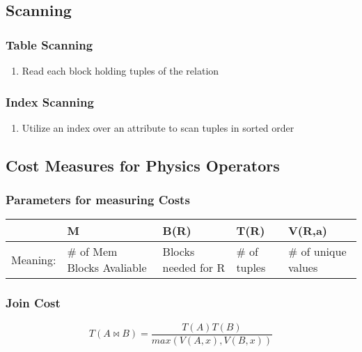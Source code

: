 \documentclass[11pt]{article}
\begin{document}
\subsection{Scanning}
\label{sec-12.2}

\subsubsection{Table Scanning}
\label{sec-12.2.1}

\begin{enumerate}
\item Read each block holding tuples of the relation
\end{enumerate}
\subsubsection{Index Scanning}
\label{sec-12.2.2}

\begin{enumerate}
\item Utilize an index over an attribute to scan tuples in sorted
       order
\end{enumerate}
\subsection{Cost Measures for Physics Operators}
\label{sec-12.3}

\subsubsection{Parameters for measuring Costs}
\label{sec-12.3.1}


\begin{center}
\begin{tabular}{lllll}
           &  M                           &  B(R)                 &  T(R)          &  V(R,a)               \\
\hline
 Meaning:  &  \# of Mem Blocks Avaliable  &  Blocks needed for R  &  \# of tuples  &  \# of unique values  \\
\end{tabular}
\end{center}


\subsubsection{Join Cost}
\label{sec-12.3.2}

    \begin{equation}
    T(A \bowtie B) = \frac{T(A)T(B)}{max(V(A,x), V(B,x))}
    \end{equation}
\end{document}
